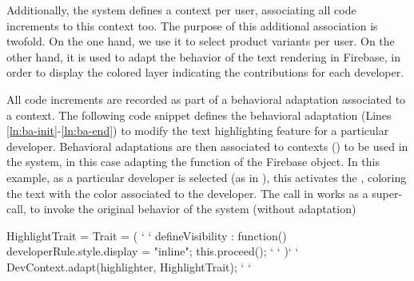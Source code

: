 Additionally, the system defines a context per user, associating all code increments to this context too. 
The purpose of this additional association is twofold. On the one hand, we use it to select product 
variants per user. On the other hand, it is used to adapt the behavior of the text rendering in Firebase, 
in order to display the colored layer indicating the contributions for each developer.

All code increments are recorded as part of a behavioral adaptation associated to a context. The 
following code snippet defines the behavioral adaptation (Lines \ref{ln:ba-init}-\ref{ln:ba-end}) to modify 
the text highlighting feature for a particular developer. Behavioral adaptations are then
associated to contexts () to be used in the system, in this case adapting the 
 function of the  Firebase object. In this example, as a 
particular developer is selected (as in ), this activates the , 
coloring the text with the color associated to the developer. The  call in  
works as a super-call, to invoke the original behavior of the system (\ie without adaptation)

\vspace{-3.5ex}
\begin{ctxtraits}[numbers=left]
 HighlightTrait = Trait = ({ ` \label{ln:ba-init} `
   defineVisibility : function() {
     developerRule.style.display = "inline";
     this.proceed();  `\label{ln:proceed} `
   }
 })` \label{ln:ba-end} `
 DevContext.adapt(highlighter, HighlightTrait); ` \label{ln:association} `
\end{ctxtraits}
\vspace{-4ex}

\endinput
